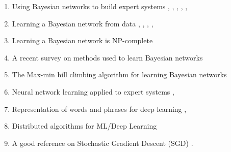 \documentclass[11pt, letterpaper]{article}
\theoremstyle{definition}
\theoremstyle{remark}
\begin{document}
\begin{enumerate}
\item Using Bayesian networks to build expert systems \cite{neapolitan2012probabilistic}, \cite{cowell2006probabilistic},
 \cite{cooper1992bayesian}, \cite{heckerman1998tutorial}, \cite{lauritzen1988local}, \cite{spiegelhalter1993bayesian}
 
 \item Learning a Bayesian network from data \cite{margaritis2003learning}, \cite{cheng1997learning}, 
 \cite{friedman1997sequential}, \cite{heckerman1995learning}, \cite{friedman1999learning}
 
 \item Learning a Bayesian network is NP-complete \cite{chickering1996learning}
 
 \item A recent survey on methods used to learn Bayesian networks \cite{daly2011learning} 
 
 \item The Max-min hill climbing algorithm for learning Bayesian networks \cite{tsamardinos2006max}

 \item Neural network learning applied to expert systems \cite{gallant1993neural}, \cite{bergerson1991commodity}
 
 \item Representation of words and phrases for deep learning \cite{mikolov2013efficient}, \cite{mikolov2013distributed}
 
 \item Distributed algorithms for ML/Deep Learning \cite{dai2013petuum}
 
 \item A good reference on Stochastic Gradient Descent (SGD) \cite{bottou2012stochastic}.
\end{enumerate}



\end{document}
